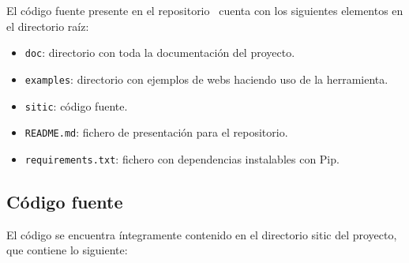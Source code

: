 El código fuente presente en el repositorio~\cite{repositorio} cuenta con los siguientes
elementos en el directorio raíz:

\begin{itemize}
    \item \texttt{doc}: directorio con toda la documentación del proyecto.
    \item \texttt{examples}: directorio con ejemplos de webs haciendo uso de la herramienta.
    \item \texttt{sitic}: código fuente.
    \item \texttt{README.md}: fichero de presentación para el repositorio.
    \item \texttt{requirements.txt}: fichero con dependencias instalables con Pip.
\end{itemize}

\subsection{Código fuente}

El código se encuentra íntegramente contenido en el directorio sitic del proyecto, que contiene lo siguiente:

